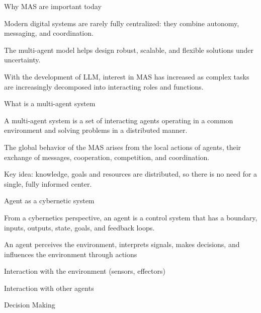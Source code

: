 \begin{frame}{Why MAS are important today}
	\topline
	\justifying
	\begin{textitemize}
		\item Modern digital systems are rarely fully centralized: they combine autonomy, messaging, and coordination.
		\item The multi-agent model helps design robust, scalable, and flexible solutions under uncertainty.
		\item With the development of LLM, interest in MAS has increased as complex tasks are increasingly decomposed into interacting roles and functions.
	\end{textitemize}
\end{frame}

\begin{frame}{What is a multi-agent system}
	\topline
	\justifying
	\begin{textitemize}
		\item A multi-agent system is a set of interacting agents operating in a common environment and solving problems in a distributed manner.
		\item The global behavior of the MAS arises from the local actions of agents, their exchange of messages, cooperation, competition, and coordination.
		\item Key idea: knowledge, goals and resources are distributed, so there is no need for a single, fully informed center.
	\end{textitemize}
\end{frame}

\begin{frame}{Agent as a cybernetic system}
	\topline
	\justifying
	\begin{textitemize}
		\item From a cybernetics perspective, an agent is a control system that has a boundary, inputs, outputs, state, goals, and feedback loops.
		\item An agent perceives the environment, interprets signals, makes decisions, and influences the environment through actions
		\begin{textitemize}
			\item Interaction with the environment (sensors, effectors)
			\item Interaction with other agents
			\item Decision Making
		\end{textitemize}
	\end{textitemize}
\end{frame}

